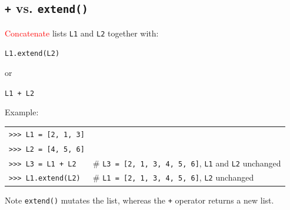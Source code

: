 \documentclass[t,handout,9pt]{beamer}
\begin{document}
\subsection{\texttt{+} vs. \texttt{extend()}}
\begin{frame}
\vfill
\textcolor{red}{Concatenate} lists \texttt{L1} and \texttt{L2} together with:
\begin{center}
	\texttt{L1.extend(L2)}
\end{center}
or
\begin{center}
	\texttt{L1 + L2}
\end{center}
\vfill
Example:
\begin{table}[]
\begin{flushleft}
\begin{tabular}{ll}
\texttt{>{}>{}> L1 = [2, 1, 3]} &  \\
\texttt{>{}>{}> L2 = [4, 5, 6]} &  \\
\texttt{>{}>{}> L3 = L1 + L2} &  \# \texttt{L3 = [2, 1, 3, 4, 5, 6]}, \texttt{L1} and \texttt{L2} unchanged\\
\texttt{>{}>{}> L1.extend(L2)} &  \# \texttt{L1 = [2, 1, 3, 4, 5, 6]}, \texttt{L2} unchanged\\
\end{tabular}
\end{flushleft}
\end{table}
\vfill
\begin{block}{Note}
\texttt{extend()} mutates the list, whereas the \texttt{+} operator returns a new list.
\end{block}
\vfill
\end{frame}
%
\end{document}

